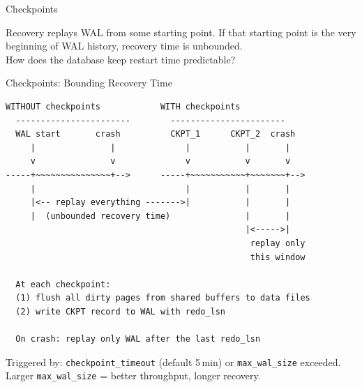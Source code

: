 \documentclass[aspectratio=169,10pt]{beamer}
\begin{document}
\begin{frame}{Checkpoints}

  \begin{block}{}
    Recovery replays WAL from some starting point.
    If that starting point is the very beginning of WAL history,
    recovery time is unbounded.\\[0.4em]
    How does the database keep restart time predictable?
  \end{block}

\end{frame}

\begin{frame}[fragile]{Checkpoints: Bounding Recovery Time}
\begin{lstlisting}[style=ascii]
  WITHOUT checkpoints            WITH checkpoints
  -----------------------        -----------------------
  WAL start       crash          CKPT_1      CKPT_2  crash
     |               |              |           |       |
     v               v              v           v       v
-----+~~~~~~~~~~~~~~~+-->      -----+~~~~~~~~~~~+~~~~~~~+-->
     |                              |           |       |
     |<-- replay everything ------->|           |       |
     |  (unbounded recovery time)               |       |
                                                |<----->|
                                                 replay only
                                                 this window

  At each checkpoint:
  (1) flush all dirty pages from shared buffers to data files
  (2) write CKPT record to WAL with redo_lsn

  On crash: replay only WAL after the last redo_lsn
\end{lstlisting}

{\small Triggered by: \texttt{checkpoint\_timeout} (default 5\,min)
or \texttt{max\_wal\_size} exceeded.\quad
Larger \texttt{max\_wal\_size} = better throughput, longer recovery.}
\end{frame}
\end{document}
